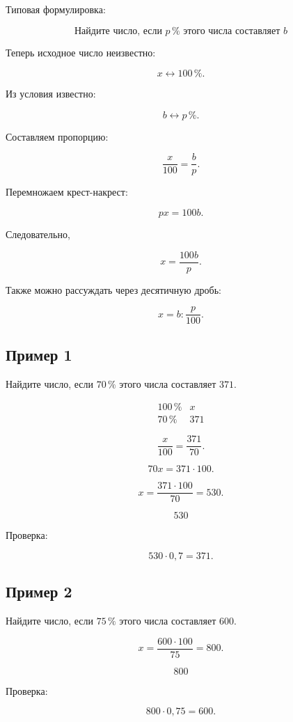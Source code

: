 \documentclass[a4paper,12pt]{article}
\newcommand{\pct}[1]{#1\,\%}
\begin{document}
Типовая формулировка:

\[
\boxed{
\text{Найдите число, если }\pct{p}\text{ этого числа составляет }b
}
\]

Теперь исходное число неизвестно:

\[
x \longleftrightarrow \pct{100}.
\]

Из условия известно:

\[
b \longleftrightarrow \pct{p}.
\]

Составляем пропорцию:

\[
\frac{x}{100}=\frac{b}{p}.
\]

Перемножаем крест-накрест:

\[
px=100b.
\]

Следовательно,

\[
\boxed{x=\frac{100b}{p}}.
\]

Также можно рассуждать через десятичную дробь:

\[
\boxed{x=b:\frac{p}{100}}.
\]

\subsection*{Пример 1}

Найдите число, если \(\pct{70}\) этого числа составляет \(371\).

\[
\begin{array}{c|c}
\pct{100} & x\\
\pct{70} & 371
\end{array}
\]

\[
\frac{x}{100}=\frac{371}{70}.
\]

\[
70x=371\cdot100.
\]

\[
x=\frac{371\cdot100}{70}=530.
\]

\[
\boxed{530}
\]

Проверка:

\[
530\cdot0{,}7=371.
\]

\subsection*{Пример 2}

Найдите число, если \(\pct{75}\) этого числа составляет \(600\).

\[
x=\frac{600\cdot100}{75}=800.
\]

\[
\boxed{800}
\]

Проверка:

\[
800\cdot0{,}75=600.
\]

\end{document}
